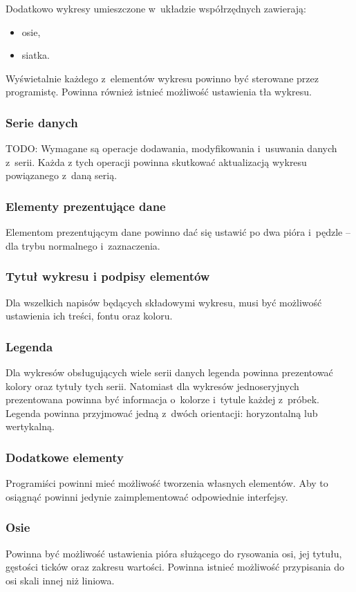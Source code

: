\documentclass[11pt,twoside,a4paper,final]{article}
\begin{document}
Dodatkowo wykresy umieszczone w~układzie współrzędnych zawierają:
\begin{itemize}
\item{osie,} %
\item{siatka.}
\end{itemize}

Wyświetalnie każdego z~elementów wykresu powinno być sterowane przez programistę. Powinna również istnieć możliwość ustawienia tła wykresu.

\subsubsection{Serie danych}
TODO:
Wymagane są operacje dodawania, modyfikowania i~usuwania danych z~serii. Każda z tych operacji powinna skutkować aktualizacją wykresu powiązanego z~daną serią.
 
\subsubsection{Elementy prezentujące dane}
Elementom prezentującym dane powinno dać się ustawić po dwa pióra i~pędzle -- dla trybu normalnego i~zaznaczenia.

\subsubsection{Tytuł wykresu i podpisy elementów}
Dla wszelkich napisów będących składowymi wykresu, musi być możliwość ustawienia ich treści, fontu oraz koloru.

\subsubsection{Legenda}
Dla wykresów obsługujących wiele serii danych legenda powinna prezentować kolory oraz tytuły tych serii. Natomiast dla wykresów jednoseryjnych prezentowana powinna być informacja o~kolorze i~tytule każdej z~próbek. Legenda powinna przyjmować jedną z~dwóch orientacji: horyzontalną lub wertykalną.

\subsubsection{Dodatkowe elementy}
Programiści powinni mieć możliwość tworzenia własnych elementów. Aby to osiągnąć powinni jedynie zaimplementować odpowiednie interfejsy.

\subsubsection{Osie}
Powinna być możliwość ustawienia pióra służącego do rysowania osi, jej tytułu, gęstości ticków oraz zakresu wartości. Powinna istnieć możliwość przypisania do osi skali innej niż liniowa.
\end{document}
